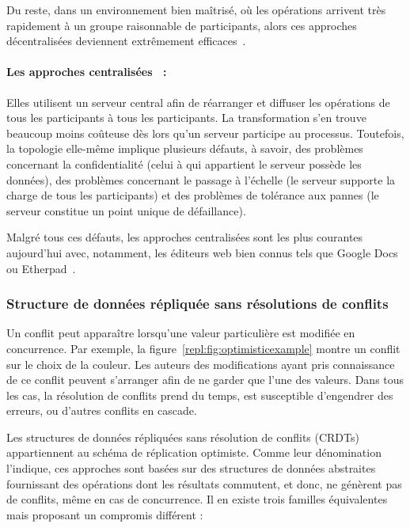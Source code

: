 \noindent Du reste, dans un environnement bien maîtrisé, où les opérations
arrivent très rapidement à un groupe raisonnable de participants, alors ces
approches décentralisées deviennent extrêmement
efficaces~\cite{mehdi2014merging}.

\paragraph{Les approches centralisées~\cite{nichols1995high} :} Elles utilisent
un serveur central afin de réarranger et diffuser les opérations de tous les
participants à tous les participants. La transformation s'en trouve beaucoup
moins coûteuse dès lors qu'un serveur participe au processus. Toutefois, la
topologie elle-même implique plusieurs défauts, à savoir, des problèmes
concernant la confidentialité (celui à qui appartient le serveur possède les
données), des problèmes concernant le passage à l'échelle (le serveur supporte
la charge de tous les participants) et des problèmes de tolérance aux pannes (le
serveur constitue un point unique de défaillance).

\noindent Malgré tous ces défauts, les approches centralisées sont les plus
courantes aujourd'hui avec, notamment, les éditeurs web bien connus tels que
Google Docs~\cite{googledocs} ou Etherpad~\cite{etherpad}.


\subsubsection{Structure de données répliquée sans résolutions de conflits}
\label{repl:subsubsec:crdts}

Un conflit peut apparaître lorsqu'une valeur particulière est modifiée en
concurrence. Par exemple, la figure~\ref{repl:fig:optimisticexample} montre un
conflit sur le choix de la couleur. Les auteurs des modifications ayant pris
connaissance de ce conflit peuvent s'arranger afin de ne garder que l'une des
valeurs. Dans tous les cas, la résolution de conflits prend du temps, est
susceptible d'engendrer des erreurs, ou d'autres conflits en cascade.

Les structures de données répliquées sans résolution de conflits
(CRDTs)~\cite{shapiro2011comprehensive, shapiro2011conflict} appartiennent au
schéma de réplication optimiste. Comme leur dénomination l'indique, ces
approches sont basées sur des structures de données abstraites fournissant des
opérations dont les résultats commutent, et donc, ne génèrent pas de conflits,
même en cas de concurrence.  Il en existe trois familles équivalentes mais
proposant un compromis différent :

